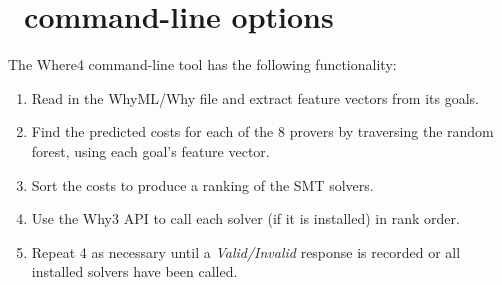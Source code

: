 \chapter{\where~command-line options} %
\thispagestyle{nohead}
\label{App:command} %

The \textsf{Where4} command-line tool has the following functionality:
\begin{enumerate}
	\item Read in the WhyML/Why file and extract feature vectors from its goals.%
	\item Find the predicted costs for each of the 8 provers by traversing the random forest, using each goal's feature vector.
	\item Sort the costs to produce a ranking of the SMT solvers.
	\item Use the \textsf{Why3} API to call each solver (if it is installed) in rank order.
	\item Repeat 4 as necessary until a \textit{Valid/Invalid} response is recorded or all installed solvers have been called.
\end{enumerate}
